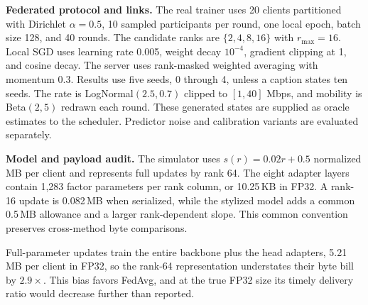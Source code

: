 \documentclass[preprint,12pt]{elsarticle}
\begin{document}
\textbf{Federated protocol and links.} The real trainer uses 20 clients partitioned with Dirichlet $\alpha=0.5$, 10 sampled participants per round, one local epoch, batch size 128, and 40 rounds. The candidate ranks are $\{2,4,8,16\}$ with $r_{\max}=16$. Local SGD uses learning rate 0.005, weight decay $10^{-4}$, gradient clipping at 1, and cosine decay. The server uses rank-masked weighted averaging with momentum 0.3. Results use five seeds, 0 through 4, unless a caption states ten seeds. The rate is LogNormal$(2.5,0.7)$ clipped to $[1,40]$ Mbps, and mobility is Beta$(2,5)$ redrawn each round. These generated states are supplied as oracle estimates to the scheduler. Predictor noise and calibration variants are evaluated separately.

\begin{table}[H]
\centering
\caption{Payload audit of the actual serialized adapter-update size against the stylized payload model $s(r)$. The frozen backbone (1.28\,M parameters) is 5.13\,MB in FP32; factor shapes are listed in the reproducibility package.}
\label{tab:audit}
\end{table}

\textbf{Model and payload audit.} The simulator uses $s(r)=0.02r+0.5$ normalized MB per client and represents full updates by rank 64. The eight adapter layers contain 1{,}283 factor parameters per rank column, or 10.25\,KB in FP32. A rank-16 update is 0.082\,MB when serialized, while the stylized model adds a common 0.5\,MB allowance and a larger rank-dependent slope. This common convention preserves cross-method byte comparisons.

Full-parameter updates train the entire backbone plus the head adapters, 5.21\,MB per client in FP32, so the rank-64 representation understates their byte bill by $2.9\times$. This bias favors FedAvg, and at the true FP32 size its timely delivery ratio would decrease further than reported.
\end{document}
